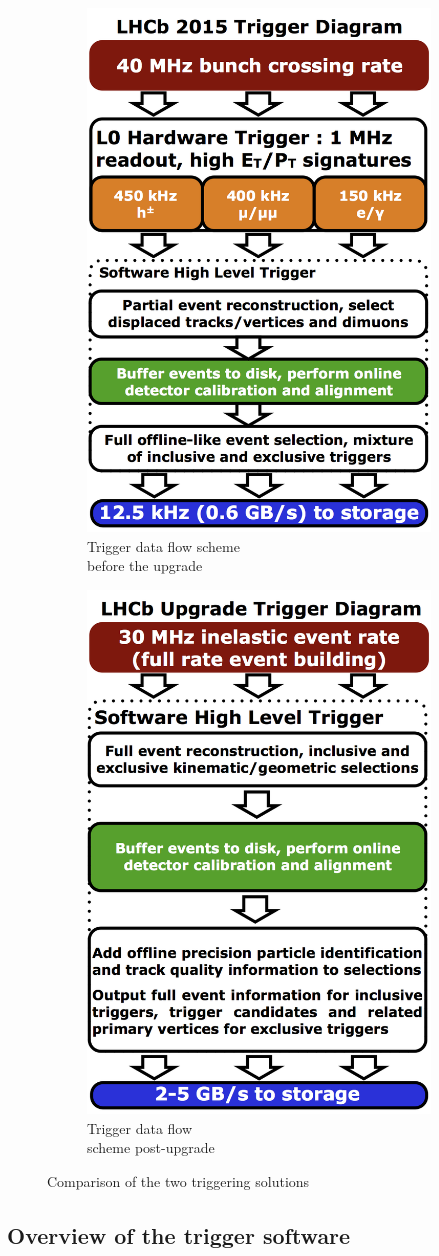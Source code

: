 \documentclass[12pt]{article}
\begin{document}
\begin{figure}[H]
	\centering
	\begin{subfigure}{.5\textwidth}
		\centering
		\includegraphics[width=.4\linewidth]{LHCb_Trigger_RunII_May2015}
		\caption{Trigger data flow scheme\\ before the upgrade}
		\label{fig:sub1}
	\end{subfigure}%
	\begin{subfigure}{.5\textwidth}
		\centering
		\includegraphics[width=.4\linewidth]{LHCb_Trigger_RunIII_May2015}
		\caption{Trigger data flow\\ scheme post-upgrade}
		\label{fig:sub2}
	\end{subfigure}
	\caption{Comparison of the two triggering solutions}
	\label{fig_trigger_compare}
\end{figure}


\subsection{Overview of the trigger software}
\label{intro_algos_overview}
	
\end{document}
